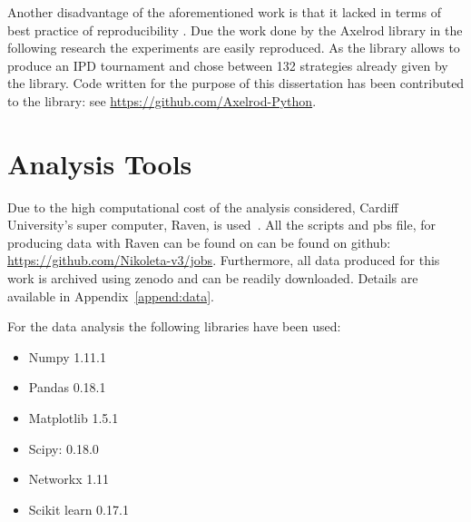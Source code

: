 Another disadvantage of the aforementioned work is that it lacked in terms of
best practice of reproducibility \cite{Axelrod1980a,Axelrod1980b,Stephens2002,Chong2004,Stewart2013}.
Due the work done by the Axelrod library \cite{axelrodproject} in the following research
the experiments are easily reproduced. As the library allows to produce an IPD
tournament and chose between 132 strategies already given by the library.
Code written for the purpose of this dissertation has been contributed to the
library: see \url{https://github.com/Axelrod-Python}.

\section{Analysis Tools}
Due to the high computational cost of the analysis considered, Cardiff
University's super computer, Raven, is used~\cite{raven}. All the scripts and pbs
file, for producing data with Raven can be found on can be found on github:
\url{https://github.com/Nikoleta-v3/jobs}. Furthermore, all data produced for
this work is archived using zenodo and can be readily downloaded. Details are
available in Appendix~\ref{append:data}.

For the data analysis the following libraries have been used:

\begin{multicols}{2}
	\begin{itemize}
		\item Numpy 1.11.1~\cite{numpy}
		\item Pandas 0.18.1~\cite{pandas}
		\item Matplotlib 1.5.1~\cite{matplot}
		\item Scipy: 0.18.0~\cite{scipy}
		\item Networkx 1.11~\cite{networkx}
    \item Scikit learn 0.17.1~\cite{scikit}
	\end{itemize}
\end{multicols}

